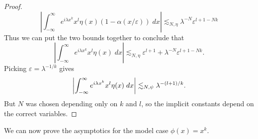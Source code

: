 \begin{proof}
  \[ \left| \int_{-\infty}^\infty e^{i \lambda x^k} x^l \eta(x) (1 - \alpha(x/\varepsilon))\; dx \right| \lesssim_{N,\eta} \lambda^{-N} \varepsilon^{l + 1 - Nk} \]
  Thus we can put the two bounds together to conclude that
  \[ \left| \int_{-\infty}^\infty e^{i \lambda x^k} x^l \eta(x)\; dx \right| \lesssim_{N,\eta} \varepsilon^{l+1} + \lambda^{-N} \varepsilon^{l+1-Nk}. \]
  Picking $\varepsilon = \lambda^{-1/k}$ gives
  \[ \left| \int_{-\infty}^\infty e^{i \lambda x^k} x^l \eta(x)\; dx \right| \lesssim_{N,\psi} \lambda^{-(l+1)/k}. \qedhere \]
  But $N$ was chosen depending only on $k$ and $l$, so the implicit constants depend on the correct variables.
\end{proof}


We can now prove the asymptotics for the model case $\phi(x) = x^k$.

